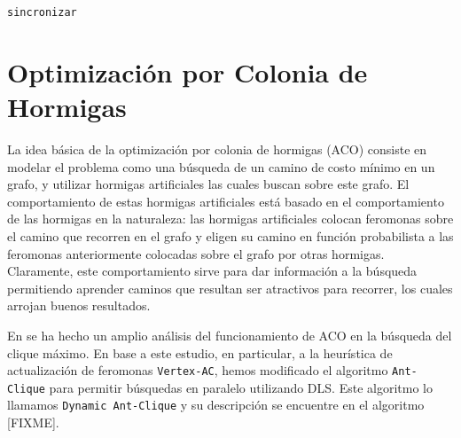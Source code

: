 \documentclass[conference]{IEEEtran}
\begin{document}
\begin{scriptsize}
\LinesNumbered
\begin{algoritmo}[htp]
\label{cdls:sync}

 \caption{\texttt{sincronizar}}
  \DontPrintSemicolon

\end{algoritmo}
\end{scriptsize}


\section{Optimización por Colonia de Hormigas}
\label{sec:aco}

La idea básica de la optimización por colonia de hormigas (ACO)
consiste en modelar el problema como una búsqueda de un camino de
costo mínimo en un grafo, y utilizar hormigas artificiales las cuales
buscan sobre este grafo. El comportamiento de estas hormigas
artificiales está basado en el comportamiento de las hormigas en la
naturaleza: las hormigas artificiales colocan feromonas sobre el
camino que recorren en el grafo y eligen su camino en función
probabilista a las feromonas anteriormente colocadas sobre el grafo
por otras hormigas. Claramente, este comportamiento sirve para dar
información a la búsqueda permitiendo aprender caminos que resultan
ser atractivos para recorrer, los cuales arrojan buenos resultados.

En \cite{aco1, aco2} se ha hecho un amplio análisis del funcionamiento
de ACO en la búsqueda del clique máximo. En base a este estudio, en
particular, a la heurística de actualización de feromonas
\texttt{Vertex-AC}, hemos modificado el algoritmo \texttt{Ant-Clique}
para permitir búsquedas en paralelo utilizando DLS. Este algoritmo lo
llamamos \texttt{Dynamic Ant-Clique} y su descripción se encuentre en
el algoritmo [FIXME].
\end{document}
